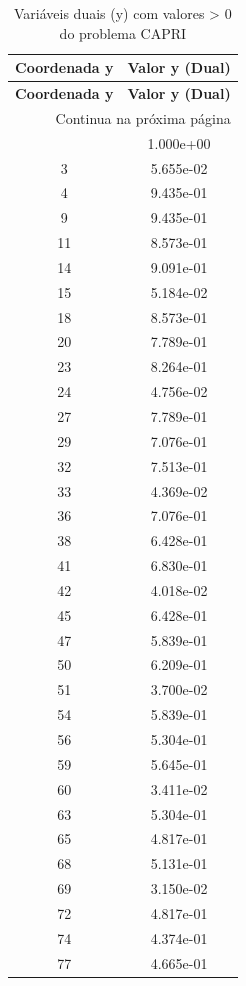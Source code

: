 \documentclass[12pt]{article}
\begin{document}
\begin{longtable}{@{}cc@{}}
\caption{Variáveis duais (y) com valores > 0 do problema CAPRI} \\
\toprule
\textbf{Coordenada y} & \textbf{Valor y (Dual)} \\
\midrule
\endfirsthead

\toprule
\textbf{Coordenada y} & \textbf{Valor y (Dual)} \\
\midrule
\endhead

\midrule \multicolumn{2}{r}{{Continua na próxima página}} \\ \midrule
\endfoot

\bottomrule
\endlastfoot
2 & 1.000e+00 \\
3 & 5.655e-02 \\
4 & 9.435e-01 \\
9 & 9.435e-01 \\
11 & 8.573e-01 \\
14 & 9.091e-01 \\
15 & 5.184e-02 \\
18 & 8.573e-01 \\
20 & 7.789e-01 \\
23 & 8.264e-01 \\
24 & 4.756e-02 \\
27 & 7.789e-01 \\
29 & 7.076e-01 \\
32 & 7.513e-01 \\
33 & 4.369e-02 \\
36 & 7.076e-01 \\
38 & 6.428e-01 \\
41 & 6.830e-01 \\
42 & 4.018e-02 \\
45 & 6.428e-01 \\
47 & 5.839e-01 \\
50 & 6.209e-01 \\
51 & 3.700e-02 \\
54 & 5.839e-01 \\
56 & 5.304e-01 \\
59 & 5.645e-01 \\
60 & 3.411e-02 \\
63 & 5.304e-01 \\
65 & 4.817e-01 \\
68 & 5.131e-01 \\
69 & 3.150e-02 \\
72 & 4.817e-01 \\
74 & 4.374e-01 \\
77 & 4.665e-01 \\

\end{longtable}
\end{document}
